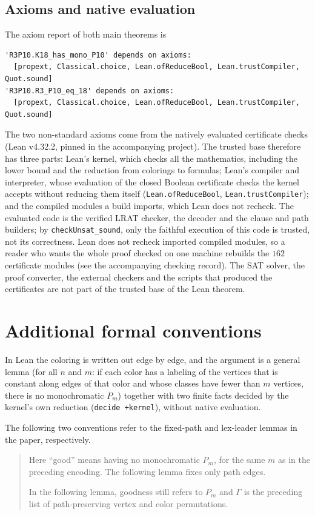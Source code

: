 \subsection{Axioms and native evaluation}
The axiom report of both main theorems is
\begin{Verbatim}
'R3P10.K18_has_mono_P10' depends on axioms:
  [propext, Classical.choice, Lean.ofReduceBool, Lean.trustCompiler, Quot.sound]
'R3P10.R3_P10_eq_18' depends on axioms:
  [propext, Classical.choice, Lean.ofReduceBool, Lean.trustCompiler, Quot.sound]
\end{Verbatim}
The two non-standard axioms come from the natively evaluated certificate
checks (Lean v4.32.2, pinned in the accompanying project). The trusted base
therefore has three parts: Lean's kernel, which checks all the mathematics,
including the lower bound and the reduction from colorings to formulas;
Lean's compiler and interpreter, whose evaluation of the closed Boolean
certificate checks the kernel accepts without reducing them itself
(\texttt{Lean.ofReduceBool}, \texttt{Lean.trustCompiler}); and the
compiled modules a build imports, which Lean does not recheck. The evaluated code
is the verified LRAT checker, the decoder and the clause and path builders;
by \texttt{checkUnsat\_sound}, only the faithful execution of this code is
trusted, not its correctness. Lean does not recheck imported compiled
modules, so a reader who wants the whole proof checked on one machine
rebuilds the $162$ certificate modules (see the accompanying checking record). The SAT
solver, the proof converter, the external checkers and the scripts that
produced the certificates are not part of the trusted base of the Lean
theorem.



\section{Additional formal conventions}
In Lean the coloring is written out edge by edge, and the argument is a
general lemma (for all $n$ and $m$: if each color has a labeling of the
vertices that is constant along edges of that color and whose classes have
fewer than $m$ vertices, there is no monochromatic $P_m$) together with two
finite facts decided by the kernel's own reduction (\texttt{decide
+kernel}), without native evaluation.


The following two conventions refer to the fixed-path and lex-leader
lemmas in the paper, respectively.
\begin{quote}
Here ``good'' means having no monochromatic $P_m$, for the same $m$
as in the preceding encoding. The following lemma fixes only path edges.

In the following lemma, goodness still refers to $P_m$ and $\Gamma$ is
the preceding list of path-preserving vertex and color permutations.
\end{quote}

